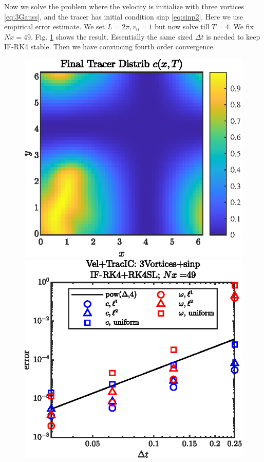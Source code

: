 \documentclass[11pt,letterpaper]{article}
\begin{document}
Now we solve the problem where the velocity is initialize with three vortices \eqref{eq:3Gauss}, and the tracer has initial condition sinp \eqref{eq:sinp2}. Here we use empirical error estimate. We set $L = 2\pi, v_0 = 1$ but now solve till $T = 4$. We fix $Nx = 49$. Fig. \ref{fig:NSAdv_c_final_3Vortices_sinp} shows the result. Essentially the same sized $\Delta t$ is needed to keep IF-RK4 stable. Then we have convincing fourth order convergence. 
\begin{figure}[H]
    \centering
    \includegraphics{figs/NSAdv_c_final_3Vortices_sinp}
    \includegraphics{figs/NSAdv_conv_order_3Vortices_sinp}
    \caption{}\label{fig:NSAdv_c_final_3Vortices_sinp}
\end{figure}

\newpage


\end{document}
